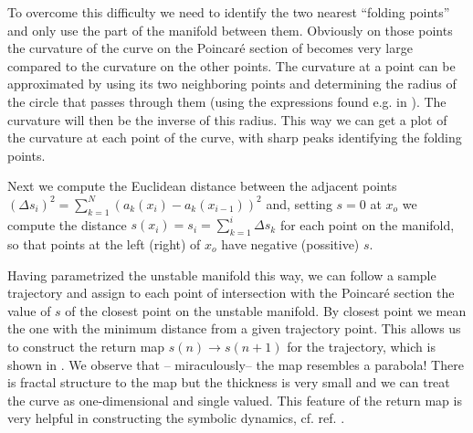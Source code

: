 \documentclass[pre,preprint,groupedaddress,showpacs,showkeys]{revtex4}
\begin{document}
  To overcome this difficulty we need to identify the two nearest ``folding points'' and only
  use the part of the manifold between them. Obviously on those
  points the curvature of the curve on the Poincar\'e section of
   becomes very large compared to the curvature
  on the other points. The curvature at a point can be approximated by
  using its two neighboring points and determining the radius of the
  circle that passes through them (using the expressions found e.g. in
  \cite{circle}). The curvature will then be the
  inverse of this radius. This way we can get a plot of the curvature at
  each point of the curve, with sharp peaks identifying the folding
  points.

  Next we compute the Euclidean distance between the
  adjacent points $(\Delta s_i)^2=\sum_{k=1}^N \left(a_k(x_i)-a_k(x_{i-1})\right)^2$ and,
  setting $s=0$ at $x_o$ we compute
  the distance $s(x_i)=s_i=\sum_{k=1}^i \Delta s_k $ for each point on the manifold, so that points
  at the left (right) of $x_o$ have negative (possitive) $s$.

  Having parametrized the unstable manifold this way, we can follow a
  sample trajectory and assign to each point of intersection with the
  Poincar\'e section the value of $s$ of the closest point on the
  unstable manifold. By closest point we mean the one with the minimum distance
  from a given trajectory point. This allows us to construct the return map
  $s(n)\rightarrow s(n+1)$ for the trajectory, which is shown in
  . We observe that -- miraculously-- the map
  resembles a parabola! There is fractal structure to the map but the
  thickness is very small and we can treat the curve as
  one-dimensional and single valued. This feature of the return map
  is very helpful in constructing the symbolic dynamics, cf. ref. \cite{Christiansen:97}.
\end{document}
